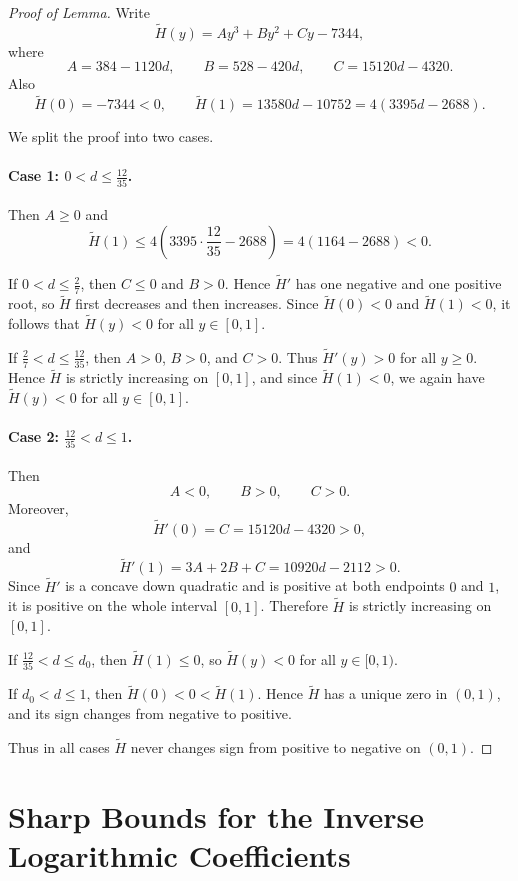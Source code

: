 \documentclass[10pt,a4paper]{amsart}
\numberwithin{equation}{section}
\begin{document}
\begin{proof}[Proof of Lemma]
Write
\[
\widetilde H(y)=A y^3+B y^2+C y-7344,
\]
where
\[
A=384-1120d,\qquad B=528-420d,\qquad C=15120d-4320.
\]
Also
\[
\widetilde H(0)=-7344<0,
\qquad
\widetilde H(1)=13580d-10752
=4(3395d-2688).
\]

We split the proof into two cases.

\paragraph{Case 1: $0<d\le \frac{12}{35}$.}
Then $A\ge0$ and
\[
\widetilde H(1)\le 4\left(3395\cdot \frac{12}{35}-2688\right)
=4(1164-2688)<0.
\]

If $0<d\le \frac27$, then $C\le0$ and $B>0$. Hence $\widetilde H'$ has one negative and one positive root, so $\widetilde H$ first decreases and then increases. Since $\widetilde H(0)<0$ and $\widetilde H(1)<0$, it follows that $\widetilde H(y)<0$ for all $y\in[0,1]$.

If $\frac27<d\le \frac{12}{35}$, then $A>0$, $B>0$, and $C>0$. Thus $\widetilde H'(y)>0$ for all $y\ge0$. Hence $\widetilde H$ is strictly increasing on $[0,1]$, and since $\widetilde H(1)<0$, we again have $\widetilde H(y)<0$ for all $y\in[0,1]$.

\paragraph{Case 2: $\frac{12}{35}<d\le1$.}
Then
\[
A<0,\qquad B>0,\qquad C>0.
\]
Moreover,
\[
\widetilde H'(0)=C=15120d-4320>0,
\]
and
\[
\widetilde H'(1)=3A+2B+C=10920d-2112>0.
\]
Since $\widetilde H'$ is a concave down quadratic and is positive at both endpoints $0$ and $1$, it is positive on the whole interval $[0,1]$. Therefore $\widetilde H$ is strictly increasing on $[0,1]$.

If $\frac{12}{35}<d\le d_0$, then $\widetilde H(1)\le0$, so $\widetilde H(y)<0$ for all $y\in[0,1)$.

If $d_0<d\le1$, then $\widetilde H(0)<0<\widetilde H(1)$. Hence $\widetilde H$ has a unique zero in $(0,1)$, and its sign changes from negative to positive.

Thus in all cases $\widetilde H$ never changes sign from positive to negative on $(0,1)$.
\end{proof}



\section{Sharp Bounds for the Inverse Logarithmic Coefficients}
\end{document}
